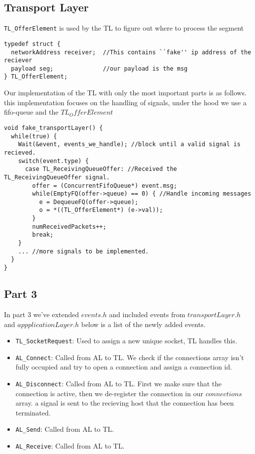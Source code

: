 \subsection{Transport Layer}

\texttt{TL\_OfferElement} is used by the TL to figure out where to process the segment
\begin{lstlisting}
typedef struct {
  networkAddress receiver;  //This contains ``fake'' ip address of the reciever
  payload seg;              //our payload is the msg
} TL_OfferElement;
\end{lstlisting}
\break

Our implementation of the TL with only the most important parts is as follows.
this implementation focuses on the handling of signals, under the hood we use a fifo-queue and the $TL_OfferElement$
\begin{lstlisting}
void fake_transportLayer() {
  while(true) {
    Wait(&event, events_we_handle); //block until a valid signal is recieved.
    switch(event.type) {
      case TL_ReceivingQueueOffer: //Received the TL_ReceivingQueueOffer signal.
        offer = (ConcurrentFifoQueue*) event.msg;
        while(EmptyFQ(offer->queue) == 0) { //Handle incoming messages
          e = DequeueFQ(offer->queue);
          o = *((TL_OfferElement*) (e->val));
        }
        numReceivedPackets++;
        break;
    }
    ... //more signals to be implemented.
  }
}
\end{lstlisting}

\subsection{Part 3}

In part 3 we've extended $events.h$ and included events from $transportLayer.h$ and $appplicationLayer.h$
below is a list of the newly added events.
\begin{itemize}
\item \texttt{TL\_SocketRequest}: Used to assign a new unique socket, TL handles this.

\item \texttt{AL\_Connect}: Called from AL to TL.
We check if the connections array isn't fully occupied and try to open a connection and assign a connection id.

\item \texttt{AL\_Disconnect}: Called from AL to TL. First we make sure that the connection is active, then we de-register the connection in our $connections$ array.
a signal is sent to the recieving host that the connection has been terminated.

\item \texttt{AL\_Send}: Called from AL to TL.

\item \texttt{AL\_Receive}: Called from AL to TL.

\end{itemize}

